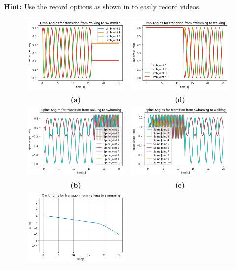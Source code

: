 \documentclass{cmc}
\begin{document}
\textbf{Hint:} Use the record options as shown in  to
easily record videos.

\begin{figure}[H]
\centering
\begin{tabular}{cc}
\includegraphics[height=0.3\columnwidth]{figures/8g_2_limb.png} &
\includegraphics[height=0.3\columnwidth]{figures/8g_3_limb.png} \\
\textbf{(a)} & \textbf{(d)} \\
\includegraphics[height=0.3\columnwidth]{figures/8g_2_spine.png} &
\includegraphics[height=0.3\columnwidth]{figures/8g_3_spine.png} \\
\textbf{(b)} & \textbf{(e)} \\
\includegraphics[height=0.3\columnwidth]{figures/8g_2_x.png} &

\end{tabular}
\end{figure}
\end{document}
